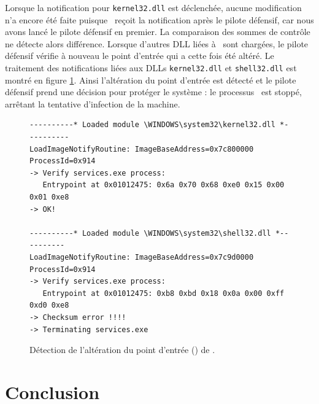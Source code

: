 Lorsque la notification pour \texttt{kernel32.dll} est déclenchée, aucune modification n'a encore été faite puisque \duqu\ reçoit la notification après le pilote défensif, car nous avons lancé le pilote défensif en premier.
La comparaison des sommes de contrôle ne détecte alors différence.
Lorsque d'autres DLL liées à \services\ sont chargées, le pilote défensif vérifie à nouveau le point d'entrée qui a cette fois été altéré.
Le traitement des notifications liées aux DLLs \texttt{kernel32.dll} et \texttt{shell32.dll} est montré en figure \ref{fig:Breakpoint2}.
Ainsi l'altération du point d'entrée est détecté et le pilote défensif prend une décision pour protéger le système : le processus \services\ est stoppé, arrêtant la tentative d'infection de la machine.


\begin{figure}[h]
\begin{center}
\scriptsize
\begin{lstlisting}[language={}]
----------* Loaded module \WINDOWS\system32\kernel32.dll *----------
LoadImageNotifyRoutine: ImageBaseAddress=0x7c800000 ProcessId=0x914 
-> Verify services.exe process: 
   Entrypoint at 0x01012475: 0x6a 0x70 0x68 0xe0 0x15 0x00 0x01 0xe8
-> OK!

----------* Loaded module \WINDOWS\system32\shell32.dll *----------
LoadImageNotifyRoutine: ImageBaseAddress=0x7c9d0000 ProcessId=0x914 
-> Verify services.exe process:
   Entrypoint at 0x01012475: 0xb8 0xbd 0x18 0x0a 0x00 0xff 0xd0 0xe8
-> Checksum error !!!!
-> Terminating services.exe
\end{lstlisting}
\end{center}
\caption{Détection de l'altération du point d'entrée () de \services.\label{fig:Breakpoint2}}
\end{figure}

\section{Conclusion}